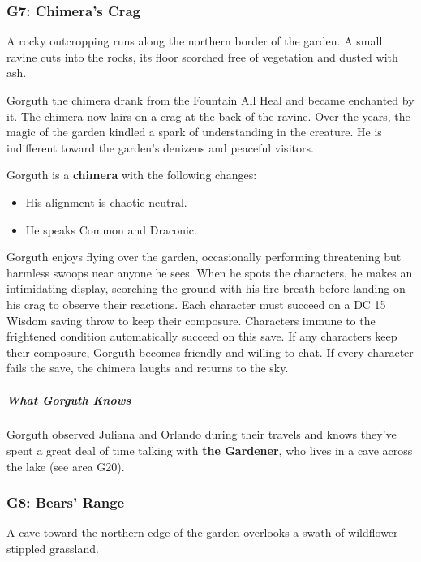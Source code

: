 \documentclass[10pt,a4paper,twoside,bg=print,twocolumn,openany,nodeprecatedcode]{dndbook}
\begin{document}
\subsubsection{G7: Chimera's Crag}
\begin{DndReadAloud}{}
A rocky outcropping runs along the northern border of the garden. A small ravine cuts into the rocks, its floor scorched free of vegetation and dusted with ash.

\end{DndReadAloud}

Gorguth the chimera drank from the Fountain All Heal and became enchanted by it. The chimera now lairs on a crag at the back of the ravine. Over the years, the magic of the garden kindled a spark of understanding in the creature. He is indifferent toward the garden's denizens and peaceful visitors.

Gorguth is a \textbf{chimera} with the following changes:


\begin{itemize}
\item His alignment is chaotic neutral.
\item He speaks Common and Draconic.
\end{itemize}

Gorguth enjoys flying over the garden, occasionally performing threatening but harmless swoops near anyone he sees. When he spots the characters, he makes an intimidating display, scorching the ground with his fire breath before landing on his crag to observe their reactions. Each character must succeed on a DC 15 Wisdom saving throw to keep their composure. Characters immune to the frightened condition automatically succeed on this save. If any characters keep their composure, Gorguth becomes friendly and willing to chat. If every character fails the save, the chimera laughs and returns to the sky.

\subparagraph{What Gorguth Knows}
Gorguth observed Juliana and Orlando during their travels and knows they've spent a great deal of time talking with \textbf{the Gardener}, who lives in a cave across the lake (see area G20).

\subsubsection{G8: Bears' Range}
\begin{DndReadAloud}{}
A cave toward the northern edge of the garden overlooks a swath of wildflower-stippled grassland.

\end{DndReadAloud}
\end{document}
